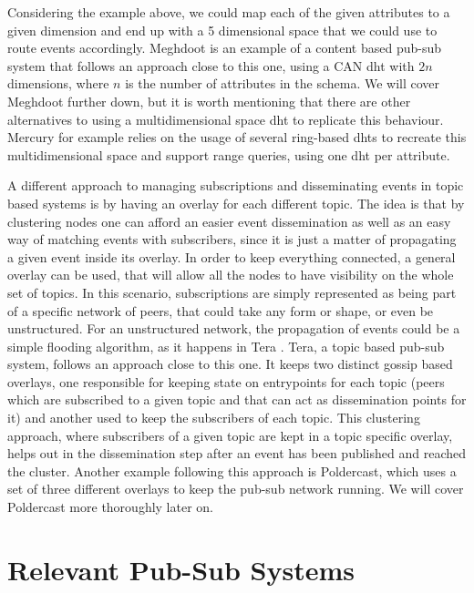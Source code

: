Considering the example above, we could map each of the given attributes to a
given dimension and end up with a 5 dimensional space that we could use to
route events accordingly. Meghdoot is an example of a content based pub-sub
system that follows an approach close to this one, using a CAN \acrshort{dht}
with $2n$ dimensions, where $n$ is the number of attributes in the schema. We
will cover Meghdoot further down, but it is worth mentioning that there are
other alternatives to using a multidimensional space \acrshort{dht} to
replicate this behaviour. Mercury for example relies on the usage of several
ring-based \acrshort{dht}s to recreate this multidimensional space and support
range queries, using one \acrshort{dht} per attribute.

A different approach to managing subscriptions and disseminating events in
topic based systems is by having an overlay for each different topic.  The idea
is that by clustering nodes one can afford an easier event dissemination as
well as an easy way of matching events with subscribers, since it is just a
matter of propagating a given event inside its overlay. In order to keep
everything connected, a general overlay can be used, that will allow all the
nodes to have visibility on the whole set of topics. In this scenario,
subscriptions are simply represented as being part of a specific network of
peers, that could take any form or shape, or even be unstructured. For an
unstructured network, the propagation of events could be a simple flooding
algorithm, as it happens in Tera \cite{Baldoni2007}. Tera, a topic based
pub-sub system, follows an approach close to this one. It keeps two distinct
gossip based overlays, one responsible for keeping state on entrypoints for
each topic (peers which are subscribed to a given topic and that can act as
dissemination points for it) and another used to keep the subscribers of each
topic. This clustering approach, where subscribers of a given topic are kept in
a topic specific overlay, helps out in the dissemination step after an event
has been published and reached the cluster. Another example following this
approach is Poldercast, which uses a set of three different overlays to keep
the pub-sub network running. We will cover Poldercast more thoroughly later on.

\section{Relevant Pub-Sub
Systems}\label{relevant-pub-sub-systems}

